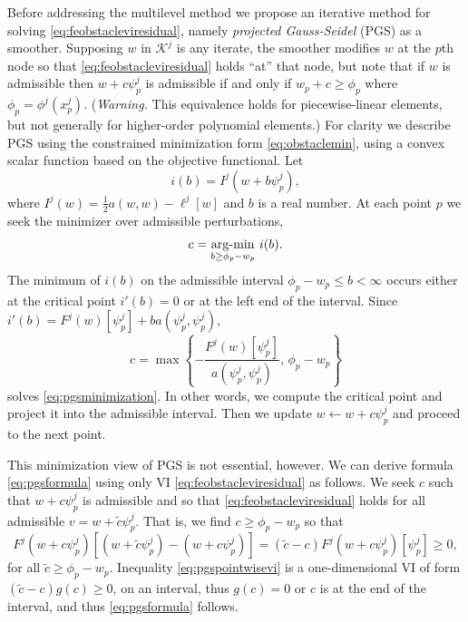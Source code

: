 \documentclass[letterpaper,final,12pt,reqno]{amsart}
\theoremstyle{claim}
\numberwithin{equation}{section}
\numberwithin{figure}{section}
\numberwithin{table}{section}
\numberwithin{theorem}{section}
\begin{document}
Before addressing the multilevel method we propose an iterative method for solving \eqref{eq:feobstacleviresidual}, namely \emph{projected Gauss-Seidel} (PGS) as a smoother.  Supposing $w$ in $\mathcal{K}^j$ is any iterate, the smoother modifies $w$ at the $p$th node so that \eqref{eq:feobstacleviresidual} holds ``at'' that node, but note that if $w$ is admissible then $w+c\psi_p^j$ is admissible if and only if $w_p + c \ge \phi_p$ where $\phi_p = \phi^j(x_p^j)$.  (\emph{Warning.}  This equivalence holds for piecewise-linear elements, but not generally for higher-order polynomial elements.)  For clarity we describe PGS using the constrained minimization form \eqref{eq:obstaclemin}, using a convex scalar function based on the objective functional.  Let
\begin{equation}
i(b) = I^j(w+b\psi_p^j),
\end{equation}
where $I^j(w) = \frac{1}{2} a(w,w) - \ell^j[w]$ and $b$ is a real number.  At each point $p$ we seek the minimizer over admissible perturbations,
\begin{equation}
  c = \mathop{\mathrm{arg\text{-}min}}_{b \ge \phi_p - w_p} \, i(b).  \label{eq:pgsminimization}
\end{equation}
The minimum of $i(b)$ on the admissible interval $\phi_p - w_p \le b < \infty$ occurs either at the critical point $i'(b)=0$ or at the left end of the interval.  Since $i'(b) = F^j(w)[\psi_p^j] + b a(\psi_p^j,\psi_p^j)$,
\begin{equation}
  c = \max\left\{-\frac{F^j(w)[\psi_p^j]}{a(\psi_p^j,\psi_p^j)}, \, \phi_p - w_p\right\}  \label{eq:pgsformula}
\end{equation}
solves \eqref{eq:pgsminimization}.  In other words, we compute the critical point and project it into the admissible interval.  Then we update $w \gets w + c\psi_p^j$ and proceed to the next point.

This minimization view of PGS is not essential, however.  We can derive formula \eqref{eq:pgsformula} using only VI \eqref{eq:feobstacleviresidual} as follows.  We seek $c$ such that $w+c\psi_p^j$ is admissible and so that \eqref{eq:feobstacleviresidual} holds for all admissible $v=w+\tilde c\psi_p^j$.  That is, we find $c\ge \phi_p-w_p$ so that
\begin{equation}
  F^j(w+c\psi_p^j)[(w+\tilde c\psi_p^j) - (w+c\psi_p^j)] = (\tilde c - c) F^j(w+c\psi_p^j)[\psi_p^j] \ge 0,  \label{eq:pgspointwisevi}
\end{equation}
for all $\tilde c\ge \phi_p-w_p$.  Inequality \eqref{eq:pgspointwisevi} is a one-dimensional VI of form $(\tilde c - c)g(c) \ge 0$, on an interval, thus $g(c)=0$ or $c$ is at the end of the interval, and thus \eqref{eq:pgsformula} follows.
\end{document}
